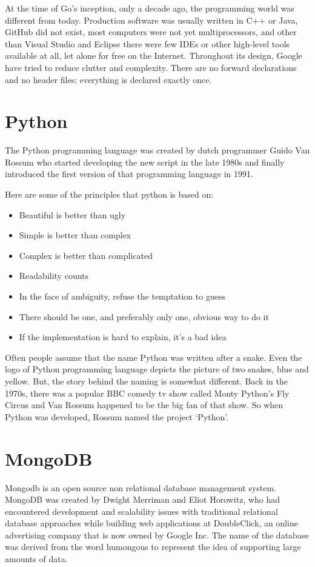 At the time of Go's inception, only a decade ago, the programming world was different from today. Production software was usually written in C++ or Java, GitHub did not exist, most computers were not yet multiprocessors, and other than Visual Studio and Eclipse there were few IDEs or other high-level tools available at all, let alone for free on the Internet. Throughout its design, Google have tried to reduce clutter and complexity. There are no forward declarations and no header files; everything is declared exactly once.\newline


\section {Python}
The Python programming language was created by dutch programmer Guido Van Rossum who started developing the new script in the late 1980s and finally introduced the first version of that programming language in 1991.\newline


Here are some of the principles that python is based on:\newline
\begin{itemize}
\item Beautiful is better than ugly
\item Simple is better than complex
\item Complex is better than complicated
\item Readability counts
\item In the face of ambiguity, refuse the temptation to guess
\item There should be one, and preferably only one, obvious way to do it
\item If the implementation is hard to explain, it’s a bad idea
\end{itemize}
Often people assume that the name Python was written after a snake. Even the logo of Python programming language depicts the picture of two snakes, blue and yellow.  But, the story behind the naming is somewhat different. Back in the 1970s, there was a popular BBC comedy tv show called Monty Python’s Fly Circus and Van Rossum happened to be the big fan of that show. So when Python was developed, Rossum named the project ‘Python’.\newline
\section {MongoDB}
Mongodb is an open source non relational database management system. MongoDB was created by Dwight Merriman and Eliot Horowitz, who had encountered development and scalability issues with traditional relational database approaches while building web applications at DoubleClick, an online advertising company that is now owned by Google Inc. The name of the database was derived from the word humongous to represent the idea of supporting large amounts of data.\newline

